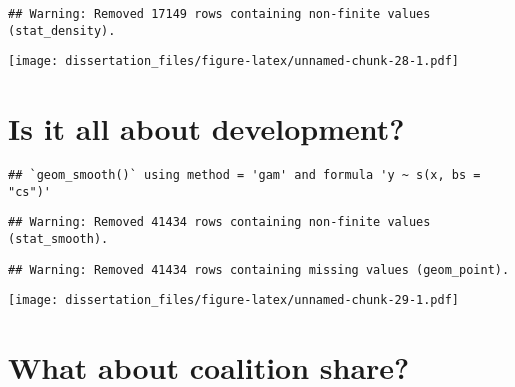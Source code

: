 \documentclass[12pt,]{book}
\newenvironment{Shaded}{\begin{snugshade}}{\end{snugshade}}
\newcommand{\DataTypeTok}[1]{\textcolor[rgb]{0.13,0.29,0.53}{#1}}
\newcommand{\FloatTok}[1]{\textcolor[rgb]{0.00,0.00,0.81}{#1}}
\newcommand{\KeywordTok}[1]{\textcolor[rgb]{0.13,0.29,0.53}{\textbf{#1}}}
\newcommand{\NormalTok}[1]{#1}
\newcommand{\OperatorTok}[1]{\textcolor[rgb]{0.81,0.36,0.00}{\textbf{#1}}}
\newcommand{\StringTok}[1]{\textcolor[rgb]{0.31,0.60,0.02}{#1}}
\begin{document}
\begin{verbatim}
## Warning: Removed 17149 rows containing non-finite values (stat_density).
\end{verbatim}

\texttt{[image: dissertation\_files/figure-latex/unnamed-chunk-28-1.pdf]}

\hypertarget{is-it-all-about-development}{%
\chapter{Is it all about development?}\label{is-it-all-about-development}}

\begin{Shaded}
\end{Shaded}

\begin{verbatim}
## `geom_smooth()` using method = 'gam' and formula 'y ~ s(x, bs = "cs")'
\end{verbatim}

\begin{verbatim}
## Warning: Removed 41434 rows containing non-finite values (stat_smooth).
\end{verbatim}

\begin{verbatim}
## Warning: Removed 41434 rows containing missing values (geom_point).
\end{verbatim}

\texttt{[image: dissertation\_files/figure-latex/unnamed-chunk-29-1.pdf]}

\hypertarget{what-about-coalition-share}{%
\chapter{What about coalition share?}\label{what-about-coalition-share}}
\end{document}
